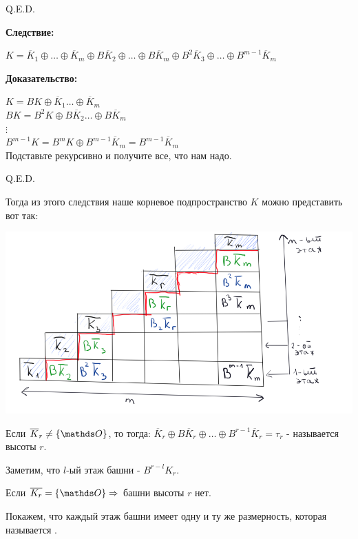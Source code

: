 \hfill Q.E.D.


\textbf{Следствие:}

$K = \overline{K}_1 \oplus \ldots \oplus \overline{K}_m \oplus B\overline{K}_2 \oplus \ldots \oplus B\overline{K}_m \oplus B^2\overline{K}_3  \oplus \ldots \oplus B^{m-1}\overline{K}_{m}$

\textbf{Доказательство:}


$K = BK \oplus \overline{K}_1\ldots \oplus \overline{K}_m$\\
$ BK = B^2K \oplus B\overline{K}_2\ldots \oplus B\overline{K}_m$\\
$\vdots$\\
$B^{m-1}K = B^m K \oplus B^{m-1}\overline{K}_m = B^{m-1} \overline{K}_m $\\
Подставьте рекурсивно и получите все, что нам надо.

\hfill Q.E.D.

Тогда из этого следствия наше корневое подпространство $K$ можно представить вот так:

\begin{center}
   \includegraphics[width = 15cm]{assets/7_9-zhordan-pyramide.png}
\end{center}

 Если $\overline{K}_r\neq \{\zero\}$, то тогда:
$\overline{K}_r \oplus B\overline{K}_r \oplus \ldots \oplus B^{r-1}\overline{K}_{r} = \tau_r$ - называется  высоты $r$.

Заметим, что $l$-ый этаж башни - $B^{r-l} K_r$.

 Если $\overline{K_r}=\{\zero\} \Rightarrow$ башни высоты $r$ нет.

Покажем, что каждый этаж башни имеет одну и ту же размерность, которая называется .


